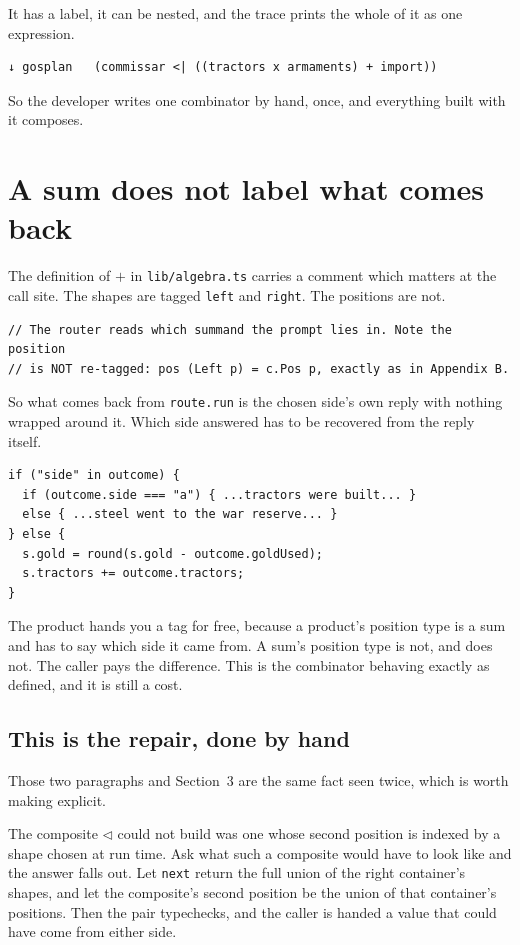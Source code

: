 \documentclass[11pt,a4paper]{article}
\begin{document}
It has a label, it can be nested, and the trace prints the whole of it as one expression.

\begin{lstlisting}[language=SH]
↓ gosplan   (commissar <| ((tractors x armaments) + import))
\end{lstlisting}

So the developer writes one combinator by hand, once, and everything built with it composes.

\section{A sum does not label what comes back}
\label{sec:repair}

The definition of $+$ in \texttt{lib/algebra.ts} carries a comment which matters at the call
site. The shapes are tagged \texttt{left} and \texttt{right}. The positions are not.

\begin{lstlisting}[language=TS]
// The router reads which summand the prompt lies in. Note the position
// is NOT re-tagged: pos (Left p) = c.Pos p, exactly as in Appendix B.
\end{lstlisting}

So what comes back from \texttt{route.run} is the chosen side's own reply with nothing wrapped
around it. Which side answered has to be recovered from the reply itself.

\begin{lstlisting}[language=TS]
if ("side" in outcome) {
  if (outcome.side === "a") { ...tractors were built... }
  else { ...steel went to the war reserve... }
} else {
  s.gold = round(s.gold - outcome.goldUsed);
  s.tractors += outcome.tractors;
}
\end{lstlisting}

The product hands you a tag for free, because a product's position type is a sum and has to say
which side it came from. A sum's position type is not, and does not. The caller pays the
difference. This is the combinator behaving exactly as defined, and it is still a cost.

\subsection{This is the repair, done by hand}

Those two paragraphs and Section~3 are the same fact seen twice, which is worth making explicit.

The composite $\lhd$ could not build was one whose second position is indexed by a shape chosen
at run time. Ask what such a composite would have to look like and the answer falls out. Let
\texttt{next} return the full union of the right container's shapes, and let the composite's
second position be the union of that container's positions. Then the pair typechecks, and the
caller is handed a value that could have come from either side.
\end{document}
